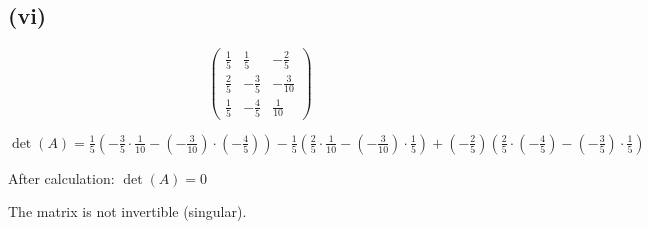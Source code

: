 \subsection*{(vi)}
\[
	\begin{pmatrix}
		\frac{1}{5} & \frac{1}{5}  & -\frac{2}{5}  \\
		\frac{2}{5} & -\frac{3}{5} & -\frac{3}{10} \\
		\frac{1}{5} & -\frac{4}{5} & \frac{1}{10}
	\end{pmatrix}
\]

$\det(A) = \frac{1}{5}(-\frac{3}{5} \cdot \frac{1}{10} - (-\frac{3}{10}) \cdot (-\frac{4}{5})) - \frac{1}{5}(\frac{2}{5} \cdot \frac{1}{10} - (-\frac{3}{10}) \cdot \frac{1}{5}) + (-\frac{2}{5})(\frac{2}{5} \cdot (-\frac{4}{5}) - (-\frac{3}{5}) \cdot \frac{1}{5})$

After calculation: $\det(A) = 0$

The matrix is not invertible (singular).